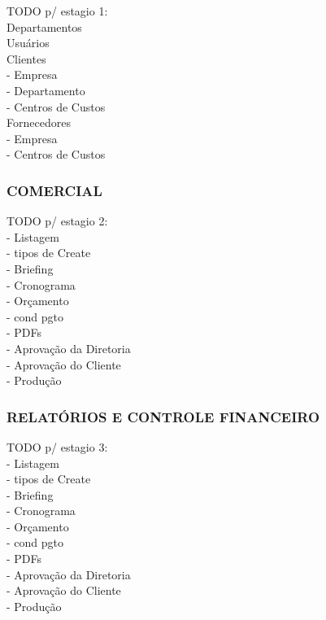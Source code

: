 \documentclass[
  12pt,				%
  openany,
  oneside,
  a4paper,			%
  english,			%
  brazil
]{article}
\numberwithin{figure}{section}
\numberwithin{table}{section}
\begin{document}
  \noindent TODO p/ estagio 1: \\
  Departamentos \\
  Usuários \\
  Clientes \\
  - Empresa \\
  - Departamento \\
  - Centros de Custos \\
  Fornecedores \\
  - Empresa \\
  - Centros de Custos


  \subsubsection{COMERCIAL}
  \noindent TODO p/ estagio 2: \\
  - Listagem \\
  - tipos de Create \\
  - Briefing \\
  - Cronograma \\
  - Orçamento \\
  - cond pgto \\
  - PDFs \\
  - Aprovação da Diretoria \\
  - Aprovação do Cliente \\
  - Produção

  \subsubsection{RELATÓRIOS E CONTROLE FINANCEIRO}
  \noindent TODO p/ estagio 3: \\
  - Listagem \\
  - tipos de Create \\
  - Briefing \\
  - Cronograma \\
  - Orçamento \\
  - cond pgto \\
  - PDFs \\
  - Aprovação da Diretoria \\
  - Aprovação do Cliente \\
  - Produção
\end{document}
